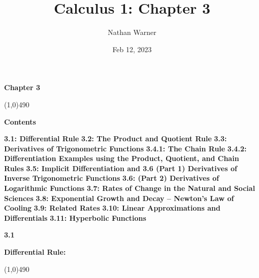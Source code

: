 \documentclass{report}
\title{\Huge{Calculus 1: Chapter 3}}
\author{\huge{Nathan Warner}}
\date{\huge{Feb 12, 2023}}
\begin{document}
    \maketitle
    \begin{center}
        \begin{Huge}
            \textbf{Chapter 3}
        \end{Huge}
    \end{center}
    \line(1,0){490}
    \bigbreak \noindent \bigbreak \noindent  
    \begin{Huge}
        \noindent \textbf{Contents}
    \end{Huge}
    \bigbreak \noindent \bigbreak \noindent 
    \begin{Large}
        \textbf{3.1: Differential Rule}
        \bigbreak \noindent \bigbreak \noindent 
        \textbf{3.2: The Product and Quotient Rule}
        \bigbreak \noindent \bigbreak \noindent 
        \textbf{3.3: Derivatives of Trigonometric Functions}
        \bigbreak \noindent \bigbreak \noindent 
        \textbf{3.4.1: The Chain Rule}
        \bigbreak \noindent \bigbreak \noindent 
        \textbf{3.4.2: Differentiation Examples using the Product, Quotient, and Chain Rules}
        \bigbreak \noindent \bigbreak \noindent 
        \textbf{3.5: Implicit Differentiation and 3.6 (Part 1) Derivatives of Inverse Trigonometric Functions}
        \bigbreak \noindent \bigbreak \noindent 
        \textbf{3.6: (Part 2) Derivatives of Logarithmic Functions}
        \bigbreak \noindent \bigbreak \noindent 
        \textbf{3.7: Rates of Change in the Natural and Social Sciences}
        \bigbreak \noindent \bigbreak \noindent 
        \textbf{3.8: Exponential Growth and Decay -- Newton's Law of Cooling}
        \bigbreak \noindent \bigbreak \noindent 
        \textbf{3.9: Related Rates}
        \bigbreak \noindent \bigbreak \noindent 
        \textbf{3.10: Linear Approximations and Differentials}
        \bigbreak \noindent \bigbreak \noindent 
        \textbf{3.11: Hyperbolic Functions}
    \end{Large}

    \pagebreak \bigbreak \noindent
    \begin{Large}
        \begin{mdframed}
            \begin{center}
                \textbf{3.1}
            \end{center}
        \end{mdframed}
    \end{Large}
    \begin{Large}
        \begin{center}
            \textbf{Differential Rule:}
        \end{center}
    \end{Large}
    \line(1,0){490}
    
\end{document}
